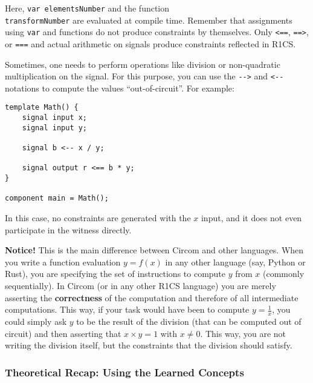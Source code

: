 \documentclass[../lecture-notes-105x135.tex]{subfiles}
\begin{document}
    Here, \texttt{var elementsNumber} and the function \\ \texttt{transformNumber}
    are evaluated at compile time. Remember that assignments using \texttt{var} and
    functions do not produce constraints by themselves. Only \texttt{<==},
    \texttt{==>}, or \texttt{===} and actual arithmetic on signals produce
    constraints reflected in R1CS.

    \begin{remark}
        Sometimes, one needs to perform operations like division or non-quadratic multiplication on the signal.
        For this purpose, you can use the \texttt{{-}->} and \texttt{<-{-}} notations to compute the values ``out-of-circuit''. For example:

        \begin{lstlisting}[language=Circom,numbers=none]
template Math() {
    signal input x;
    signal input y;

    signal b <-- x / y;

    signal output r <== b * y;
}

component main = Math();
        \end{lstlisting}\label{code:division-example}

        In this case, no constraints are generated with the $x$ input, and it does not even participate in the witness directly.

        \textcolor{green!50!black}{\textbf{Notice!}} This is the main difference between Circom and other languages. When you
        write a function evaluation $y = f(x)$ in any other language (say, Python or Rust),
        you are specifying the set of instructions to compute $y$ from $x$ (commonly
        sequentially). In Circom (or in any other R1CS language) you are merely asserting
        the \textbf{correctness} of the computation and therefore of all
        intermediate computations. This way, if your task would have been to compute
        $y = \frac{1}{x}$, you could simply ask $y$ to be the result of the division
        (that can be computed out of circuit) and then asserting that $x \times y = 1$
        with $x \neq 0$. This way, you are not writing the division itself, but
        the constraints that the division should satisfy.
    \end{remark}

    \subsubsection{Theoretical Recap: Using the Learned Concepts}
\end{document}
